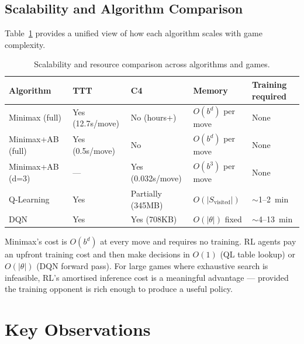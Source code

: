 \documentclass[11pt,a4paper]{article}
\begin{document}
\subsection{Scalability and Algorithm Comparison}

Table~\ref{tab:scalability} provides a unified view of how each algorithm scales with game complexity.

\begin{table}[H]
\centering
\caption{Scalability and resource comparison across algorithms and games.}
\label{tab:scalability}
\begin{tabular}{lllll}
\toprule
Algorithm & TTT & C4 & Memory & Training required \\
\midrule
Minimax (full)     & Yes (12.7s/move) & No (hours+) & $O(b^d)$ per move & None \\
Minimax+AB (full)  & Yes (0.5s/move)  & No          & $O(b^d)$ per move & None \\
Minimax+AB (d=3)   & ---              & Yes (0.032s/move) & $O(b^3)$ per move & None \\
Q-Learning         & Yes              & Partially (345MB) & $O(|S_\text{visited}|)$ & $\sim$1--2~min \\
DQN                & Yes              & Yes (708KB) & $O(|\theta|)$ fixed & $\sim$4--13~min \\
\bottomrule
\end{tabular}
\end{table}

Minimax's cost is $O(b^d)$ at every move and requires no training.  RL agents pay an upfront
training cost and then make decisions in $O(1)$ (QL table lookup) or $O(|\theta|)$ (DQN forward pass).
For large games where exhaustive search is infeasible, RL's amortised inference cost is a meaningful
advantage --- provided the training opponent is rich enough to produce a useful policy.

\section{Key Observations}
\label{sec:observations}
\end{document}
